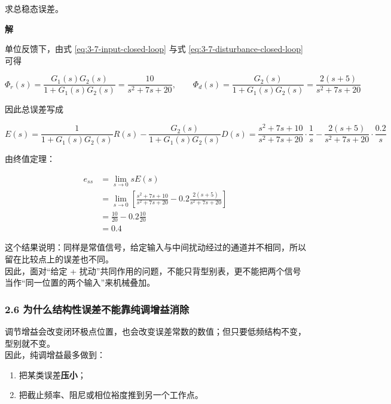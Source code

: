 \documentclass[
  11pt]{article}
\providecommand{\tightlist}{%
  \setlength{\itemsep}{0pt}\setlength{\parskip}{0pt}}
\begin{document}
求总稳态误差。

\textbf{解}

单位反馈下，由式 \ref{eq:3-7-input-closed-loop} 与式
\ref{eq:3-7-disturbance-closed-loop} 可得

\begin{equation}
\Phi_r(s)=\frac{G_1(s)G_2(s)}{1+G_1(s)G_2(s)}=\frac{10}{s^2+7s+20},
\qquad
\Phi_d(s)=\frac{G_2(s)}{1+G_1(s)G_2(s)}=\frac{2(s+5)}{s^2+7s+20}
\tag{3-7-23}\label{eq:3-7-example2-channels}
\end{equation}

因此总误差写成

\begin{equation}
E(s)=\frac{1}{1+G_1(s)G_2(s)}R(s)-\frac{G_2(s)}{1+G_1(s)G_2(s)}D(s)
=\frac{s^2+7s+10}{s^2+7s+20}\cdot \frac{1}{s}
-\frac{2(s+5)}{s^2+7s+20}\cdot \frac{0.2}{s}
\tag{3-7-24}\label{eq:3-7-example2-error}
\end{equation}

由终值定理：

\begin{equation}
\begin{aligned}
e_{ss}
&=\lim_{s\to 0}sE(s) \\
&=\lim_{s\to 0}\left[\frac{s^2+7s+10}{s^2+7s+20}-0.2\frac{2(s+5)}{s^2+7s+20}\right] \\
&=\frac{10}{20}-0.2\frac{10}{20} \\
&=0.4
\end{aligned}
\tag{3-7-25}\label{eq:3-7-example2-answer}
\end{equation}

这个结果说明：同样是常值信号，给定输入与中间扰动经过的通道并不相同，所以留在比较点上的误差也不同。\\
因此，面对``给定 +
扰动''共同作用的问题，不能只背型别表，更不能把两个信号当作``同一位置的两个输入''来机械叠加。

\subsubsection{2.6
为什么结构性误差不能靠纯调增益消除}\label{ux4e3aux4ec0ux4e48ux7ed3ux6784ux6027ux8befux5deeux4e0dux80fdux9760ux7eafux8c03ux589eux76caux6d88ux9664}

调节增益会改变闭环极点位置，也会改变误差常数的数值；但只要低频结构不变，型别就不变。\\
因此，纯调增益最多做到：

\begin{enumerate}
\def\labelenumi{\arabic{enumi}.}
\tightlist
\item
  把某类误差\textbf{压小}；
\item
  把截止频率、阻尼或相位裕度推到另一个工作点。
\end{enumerate}
\end{document}
